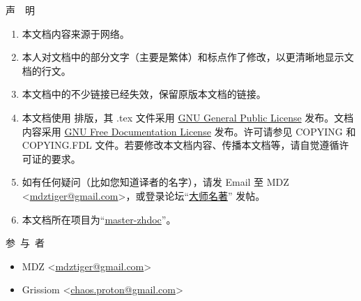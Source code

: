 \centerline{\LARGE 声\,\,\,\,\,\,明}

\baselineskip

\large
\begin{enumerate}
\item 本文档内容来源于网络。
\item 本人对文档中的部分文字（主要是繁体）和标点作了修改，以更清晰地显示文档的行文。
\item 本文档中的不少链接已经失效，保留原版本文档的链接。
\item 本文档使用 \XeLaTeX{} 排版，其 .tex 文件采用 \href{http://www.gnu.org/copyleft/gpl.html}{GNU General Public License} 发布。文档内容采用 \href{http://www.gnu.org/copyleft/fdl.html}{GNU Free Documentation License} 发布。许可请参见 COPYING 和 COPYING.FDL 文件。若要修改本文档内容、传播本文档等，请自觉遵循许可证的要求。
\item 如有任何疑问（比如您知道译者的名字），请发 Email 至 MDZ <\href{mailto:mdztiger@gmail.com}{mdztiger@gmail.com}>，或登录论坛“\href{http://groups.google.com/group/master-zhdoc?hl=zh-CN}{大师名著}” 发帖。
\item 本文档所在项目为“\href{http://code.google.com/p/master-zhdoc/}{master-zhdoc}”。
\end{enumerate}

\normalsize

\baselineskip

\centerline{\LARGE 参\,\,\,与\,\,\,者}

\large
\begin{itemize}
\item MDZ <\href{mailto:mdztiger@gmail.com}{mdztiger@gmail.com}>
\item Grissiom <\href{mailto:chaos.proton@gmail.com}{chaos.proton@gmail.com}>
\end{itemize}


\normalsize 
